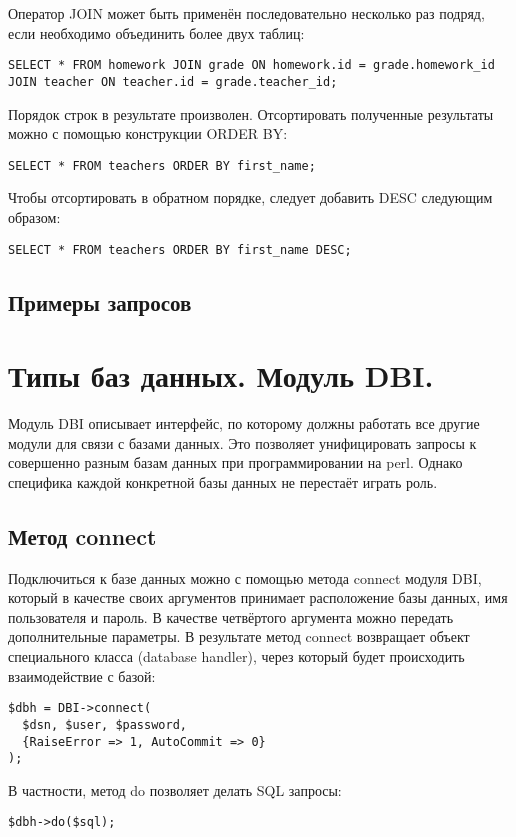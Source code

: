 Оператор JOIN может быть применён последовательно несколько раз подряд, если необходимо объединить более двух таблиц:
\begin{verbatim}
SELECT * FROM homework JOIN grade ON homework.id = grade.homework_id JOIN teacher ON teacher.id = grade.teacher_id;
\end{verbatim}


Порядок строк в результате произволен. Отсортировать полученные результаты можно с помощью конструкции ORDER BY:
\begin{verbatim}
SELECT * FROM teachers ORDER BY first_name;
\end{verbatim}
Чтобы отсортировать в обратном порядке, следует добавить DESC следующим образом:
\begin{verbatim}
SELECT * FROM teachers ORDER BY first_name DESC;
\end{verbatim}

\subsection{Примеры запросов}

\section{Типы баз данных. Модуль DBI.}

Модуль DBI описывает интерфейс, по которому должны работать все другие модули для связи с базами данных. Это позволяет унифицировать запросы к совершенно разным базам данных при программировании на perl. Однако специфика каждой конкретной базы данных не перестаёт играть роль.

\subsection{Метод connect}
Подключиться к базе данных можно с помощью метода connect модуля DBI, который в качестве своих аргументов принимает расположение базы данных, имя пользователя и пароль. В качестве четвёртого аргумента можно передать дополнительные параметры. В результате метод connect возвращает объект специального класса (database handler), через который будет происходить взаимодействие с базой:
\begin{verbatim}
$dbh = DBI->connect(
  $dsn, $user, $password,
  {RaiseError => 1, AutoCommit => 0}
);
\end{verbatim}
В частности, метод do позволяет делать SQL запросы:
\begin{verbatim}
$dbh->do($sql);
\end{verbatim}

